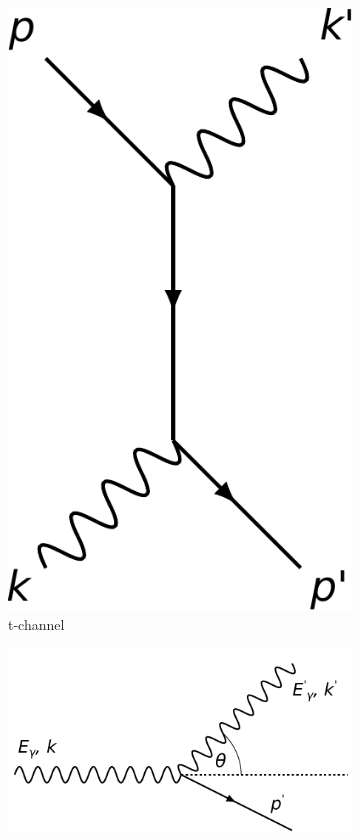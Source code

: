 \begin{figure}
\begin{subfigure}{0.2\textwidth}
		\includegraphics[width=\textwidth]{./img/t-channel.pdf}
		\caption{t-channel}
		\label{fig:tchannel}
	\end{subfigure}
	\par\bigskip
	\begin{subfigure}{0.45\textwidth}
		\centering
		\includegraphics[width=\textwidth]{./img/kinematic.pdf}

\end{subfigure}
\end{figure}
